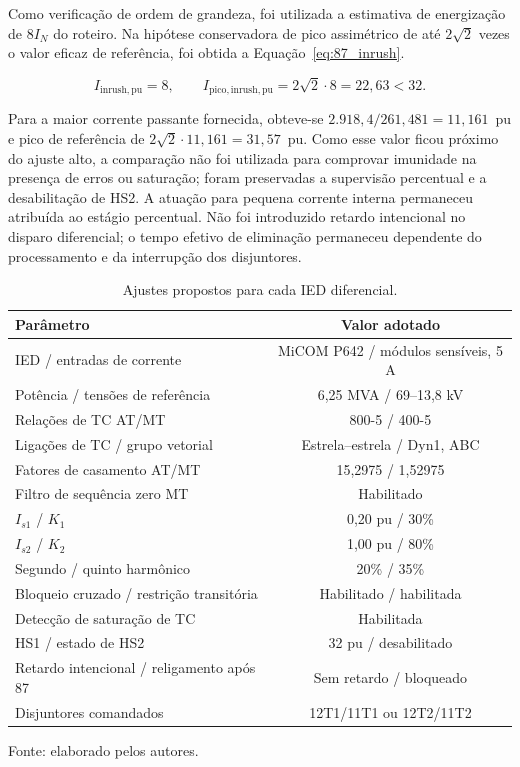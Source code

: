Como verificação de ordem de grandeza, foi utilizada a estimativa de energização de $8I_N$ do roteiro. Na hipótese conservadora de pico assimétrico de até $2\sqrt{2}$ vezes o valor eficaz de referência, foi obtida a Equação~\eqref{eq:87_inrush}.

\begin{equation}
    I_{\mathrm{inrush,pu}}=8,
    \qquad I_{\mathrm{pico,inrush,pu}}=2\sqrt{2}\cdot8=22{,}63<32.
    \label{eq:87_inrush}
\end{equation}

Para a maior corrente passante fornecida, obteve-se $2.918{,}4/261{,}481=11{,}161$~pu e pico de referência de $2\sqrt{2}\cdot11{,}161=31{,}57$~pu. Como esse valor ficou próximo do ajuste alto, a comparação não foi utilizada para comprovar imunidade na presença de erros ou saturação; foram preservadas a supervisão percentual e a desabilitação de HS2. A atuação para pequena corrente interna permaneceu atribuída ao estágio percentual. Não foi introduzido retardo intencional no disparo diferencial; o tempo efetivo de eliminação permaneceu dependente do processamento e da interrupção dos disjuntores.

\begin{table}[htbp]
    \centering
    \caption{Ajustes propostos para cada IED diferencial.}
    \label{tab:87_ajustes}
    \begin{tabular}{lc}
        \hline
        \textbf{Parâmetro} & \textbf{Valor adotado}\\
        \hline
        IED / entradas de corrente & MiCOM P642 / módulos sensíveis, 5 A\\
        Potência / tensões de referência & 6,25 MVA / 69--13,8 kV\\
        Relações de TC AT/MT & 800-5 / 400-5\\
        Ligações de TC / grupo vetorial & Estrela--estrela / Dyn1, ABC\\
        Fatores de casamento AT/MT & 15,2975 / 1,52975\\
        Filtro de sequência zero MT & Habilitado\\
        $I_{s1}$ / $K_1$ & 0,20 pu / 30\%\\
        $I_{s2}$ / $K_2$ & 1,00 pu / 80\%\\
        Segundo / quinto harmônico & 20\% / 35\%\\
        Bloqueio cruzado / restrição transitória & Habilitado / habilitada\\
        Detecção de saturação de TC & Habilitada\\
        HS1 / estado de HS2 & 32 pu / desabilitado\\
        Retardo intencional / religamento após 87 & Sem retardo / bloqueado\\
        Disjuntores comandados & 12T1/11T1 ou 12T2/11T2\\
        \hline
    \end{tabular}
    \par\vspace{2pt}
    {\small Fonte: elaborado pelos autores.}
\end{table}

